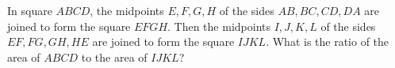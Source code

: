 In square $ABCD$, the midpoints $E,F,G,H$ of the sides $AB,BC,CD,DA$ are joined to form the square $EFGH$. Then the midpoints $I,J,K,L$ of the sides $EF,FG,GH,HE$ are joined to form the square $IJKL$. What is the ratio of the area of $ABCD$ to the area of $IJKL$?
